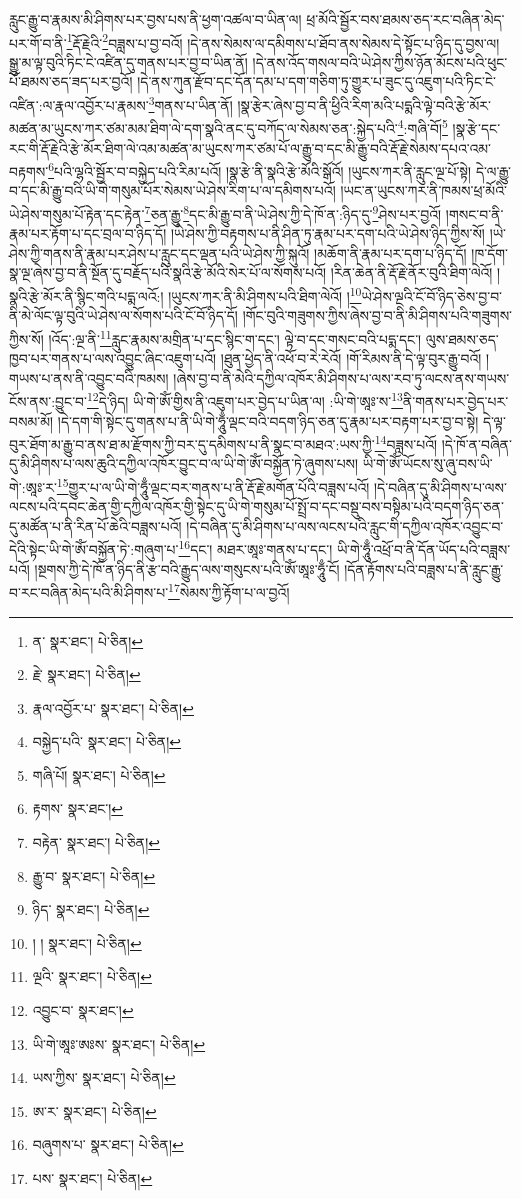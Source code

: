 རླུང་རྒྱུ་བ་རྣམས་མི་ཤིགས་པར་བྱས་པས་ནི་ཕྱག་འཚལ་བ་ཡིན་ལ། ཕྲ་མོའི་སྦྱོར་བས་ཐམས་ཅད་རང་བཞིན་མེད་པར་གོ་བ་ནི་\footnote{ན་  སྣར་ཐང་།  པེ་ཅིན། }རྡོ་རྗེའི་\footnote{རྗེ་  སྣར་ཐང་།  པེ་ཅིན། }བཟླས་པ་བྱ་བའོ། །དེ་ནས་སེམས་ལ་དམིགས་པ་ཐོབ་ནས་སེམས་དེ་སྟོང་པ་ཉིད་དུ་བྱས་ལ། སྒྱུ་མ་ལྟ་བུའི་ཏིང་ངེ་འཛིན་དུ་གནས་པར་བྱ་བ་ཡིན་ནོ། །དེ་ནས་འོད་གསལ་བའི་ཡེ་ཤེས་ཀྱིས་ཉོན་མོངས་པའི་ཕུང་པོ་ཐམས་ཅད་ཟད་པར་བྱའོ། །དེ་ནས་ཀུན་རྫོབ་དང་དོན་དམ་པ་དག་གཅིག་ཏུ་གྱུར་པ་ཟུང་དུ་འཇུག་པའི་ཏིང་ངེ་འཛིན་:ལ་རྣལ་འབྱོར་པ་རྣམས་\footnote{རྣལ་འབྱོར་པ་  སྣར་ཐང་།  པེ་ཅིན། }གནས་པ་ཡིན་ནོ། །སྣ་རྩེར་ཞེས་བྱ་བ་ནི་ཕྱིའི་རིག་མའི་པདྨའི་ལྟེ་བའི་རྩེ་མོར་མཚན་མ་ཡུངས་ཀར་ཙམ་མམ་ཐིག་ལེ་དག་སྣའི་ནང་དུ་བཀོད་ལ་སེམས་ཅན་:སྐྱེད་པའི་\footnote{བསྐྱེད་པའི་  སྣར་ཐང་།  པེ་ཅིན། }:གཞི་བོ།\footnote{གཞི་པོ།  སྣར་ཐང་།  པེ་ཅིན། } །སྣ་རྩེ་དང་རང་གི་རྡོ་རྗེའི་རྩེ་མོར་ཐིག་ལེ་འམ་མཚན་མ་ཡུངས་ཀར་ཙམ་པོ་ལ་རྒྱུ་བ་དང་མི་རྒྱུ་བའི་རྡོ་རྗེ་སེམས་དཔའ་འམ་བརྟགས་\footnote{རྟགས་  སྣར་ཐང་། }པའི་ལྷའི་སྦྱོར་བ་བསྐྱེད་པའི་རིམ་པའོ། །སྣ་རྩེ་ནི་སྣའི་རྩེ་མོའི་སྒོའོ། །ཡུངས་ཀར་ནི་རླུང་ལྔ་པོ་སྟེ། དེ་ལ་རྒྱུ་བ་དང་མི་རྒྱུ་བའི་ཡི་གེ་གསུམ་པོར་སེམས་ཡེ་ཤེས་རིག་པ་ལ་དམིགས་པའོ། །ཡང་ན་ཡུངས་ཀར་ནི་ཁམས་ཕྲ་མོའི་ཡེ་ཤེས་གསུམ་པོ་རྟེན་དང་རྟེན་\footnote{བརྟེན་  སྣར་ཐང་།  པེ་ཅིན། }ཅན་རྒྱུ་\footnote{རྒྱུ་བ་  སྣར་ཐང་།  པེ་ཅིན། }དང་མི་རྒྱུ་བ་ནི་ཡེ་ཤེས་ཀྱི་དེ་ཁོ་ན་:ཉིད་དུ་\footnote{ཉིད་  སྣར་ཐང་།  པེ་ཅིན། }ཤེས་པར་བྱའོ། །གསང་བ་ནི་རྣམ་པར་རྟོག་པ་དང་བྲལ་བ་ཉིད་དོ། །ཡེ་ཤེས་ཀྱི་བརྟགས་པ་ནི་ཤིན་ཏུ་རྣམ་པར་དག་པའི་ཡེ་ཤེས་ཉིད་ཀྱིས་སོ། །ཡེ་ཤེས་ཀྱི་གནས་ནི་རྣམ་པར་ཤེས་པ་རླུང་དང་ལྡན་པའི་ཡེ་ཤེས་ཀྱི་སྐུའོ། །མཆོག་ནི་རྣམ་པར་དག་པ་ཉིད་དོ། །ཁ་དོག་སྣ་ལྔ་ཞེས་བྱ་བ་ནི་སྔོན་དུ་བརྗོད་པའི་སྣའི་རྩེ་མོའི་སེར་པོ་ལ་སོགས་པའོ། །རིན་ཆེན་ནི་རྡོ་རྗེ་ནོར་བུའི་ཐིག་ལེའོ། །སྣའི་རྩེ་མོར་ནི་སྙིང་གའི་པདྨ་ལའོ:། །ཡུངས་ཀར་ནི་མི་ཤིགས་པའི་ཐིག་ལེའོ། །\footnote{། །  སྣར་ཐང་།  པེ་ཅིན། }ཡེ་ཤེས་ལྔའི་ངོ་བོ་ཉིད་ཅེས་བྱ་བ་ནི་མེ་ལོང་ལྟ་བུའི་ཡེ་ཤེས་ལ་སོགས་པའི་ངོ་བོ་ཉིད་དོ། །གོང་བུའི་གཟུགས་ཀྱིས་ཞེས་བྱ་བ་ནི་མི་ཤིགས་པའི་གཟུགས་ཀྱིས་སོ། །འོད་:ལྔ་ནི་\footnote{ལྔའི་  སྣར་ཐང་།  པེ་ཅིན། }རླུང་རྣམས་མགྲིན་པ་དང་སྙིང་ག་དང་། ལྟེ་བ་དང་གསང་བའི་པདྨ་དང་། ལུས་ཐམས་ཅད་ཁྱབ་པར་གནས་པ་ལས་འབྱུང་ཞིང་འཇུག་པའོ། །ཐུན་ཕྱེད་ནི་འཕོ་བ་རེ་རེའོ། །གོ་རིམས་ནི་དེ་ལྟ་བུར་རྒྱུ་བའོ། །གཡས་པ་ནས་ནི་འབྱུང་བའི་ཁམས། །ཞེས་བྱ་བ་ནི་མེའི་དཀྱིལ་འཁོར་མི་ཤིགས་པ་ལས་རབ་ཏུ་ལངས་ནས་གཡས་ངོས་ནས་:བྱུང་བ་\footnote{འབྱུང་བ་  སྣར་ཐང་། }དེ་ཉིད། ཡི་གེ་ཨོཾ་གྱིས་ནི་འཇུག་པར་བྱེད་པ་ཡིན་ལ། :ཡི་གེ་ཨཱཿ་ས་\footnote{ཡི་གེ་ཨཱཿ་ཨཿས་  སྣར་ཐང་།  པེ་ཅིན། }ནི་གནས་པར་བྱེད་པར་བསམ་མོ། །དེ་དག་གི་སྟེང་དུ་གནས་པ་ནི་ཡི་གེ་ཧཱུྃ་ལྡང་བའི་བདག་ཉིད་ཅན་དུ་རྣམ་པར་བརྟག་པར་བྱ་བ་སྟེ། དེ་ལྟ་བུར་ཐོག་མ་རྒྱུ་བ་ནས་ཐ་མ་རྫོགས་ཀྱི་བར་དུ་དམིགས་པ་ནི་སྣང་བ་མཐའ་:ཡས་ཀྱི་\footnote{ཡས་ཀྱིས་  སྣར་ཐང་།  པེ་ཅིན། }བཟླས་པའོ། །དེ་ཁོ་ན་བཞིན་དུ་མི་ཤིགས་པ་ལས་ཆུའི་དཀྱིལ་འཁོར་བྱུང་བ་ལ་ཡི་གེ་ཨོཾ་བསྐྱོན་ཏེ་ཞུགས་པས། ཡི་གེ་ཨོཾ་ཡོངས་སུ་ཞུ་བས་ཡི་གེ་:ཨཱཿ་ར་\footnote{ཨ་ར་  སྣར་ཐང་།  པེ་ཅིན། }གྱུར་པ་ལ་ཡི་གེ་ཧཱུྃ་ལྡང་བར་གནས་པ་ནི་རྡོ་རྗེ་མགོན་པོའི་བཟླས་པའོ། །དེ་བཞིན་དུ་མི་ཤིགས་པ་ལས་ལངས་པའི་དབང་ཆེན་གྱི་དཀྱིལ་འཁོར་གྱི་སྟེང་དུ་ཡི་གེ་གསུམ་པོ་སྤྲོ་བ་དང་བསྡུ་བས་བསྟིམ་པའི་བདག་ཉིད་ཅན་དུ་མཚོན་པ་ནི་རིན་པོ་ཆེའི་བཟླས་པའོ། །དེ་བཞིན་དུ་མི་ཤིགས་པ་ལས་ལངས་པའི་རླུང་གི་དཀྱིལ་འཁོར་འབྱུང་བ་དེའི་སྟེང་ཡི་གེ་ཨོཾ་བསྐྱོན་ཏེ་:གཞུག་པ་\footnote{བཞུགས་པ་  སྣར་ཐང་།  པེ་ཅིན། }དང་། མཐར་ཨཱཿ་གནས་པ་དང་། ཡི་གེ་ཧཱུྃ་འཕྲོ་བ་ནི་དོན་ཡོད་པའི་བཟླས་པའོ། །སྔགས་ཀྱི་དེ་ཁོ་ན་ཉིད་ནི་རྩ་བའི་རྒྱུད་ལས་གསུངས་པའི་ཨོཾ་ཨཱཿ་ཧཱུྃ་ངོ། །དོན་རྟོགས་པའི་བཟླས་པ་ནི་རླུང་རྒྱུ་བ་རང་བཞིན་མེད་པའི་མི་ཤིགས་པ་\footnote{པས་  སྣར་ཐང་།  པེ་ཅིན། }སེམས་ཀྱི་རྟོག་པ་ལ་བྱའོ། 